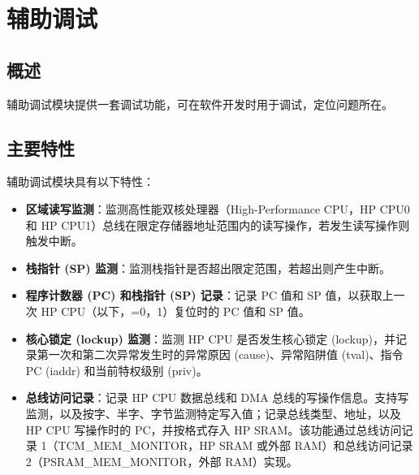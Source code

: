 \documentclass[main\_\_CN.tex]{subfiles}
\begin{document}
\setchineseformatting


\ifglobal
\else
    \clearpage
    \listoftodos
    \listofdonetodos
    \tableofcontents
\fi



\hypertarget{dbgassist}{}
\chapter{辅助调试}
\label{mod:dbgassist}

\section{概述}

\chipname{} 辅助调试模块提供一套调试功能，可在软件开发时用于调试，定位问题所在。

\section{主要特性}
\label{sec:dbgassist-features}

辅助调试模块具有以下特性：

\begin{itemize}
    \item \textbf{区域读写监测}：监测高性能双核处理器（High-Performance CPU，HP CPU0 和 HP CPU1）总线在限定存储器地址范围内的读写操作，若发生读写操作则触发中断。
    \item \textbf{栈指针 (SP) 监测}：监测栈指针是否超出限定范围，若超出则产生中断。
    \item \textbf{程序计数器 (PC) 和栈指针 (SP) 记录}：记录 PC 值和 SP 值，以获取上一次 HP CPU（以下，=0，1）复位时的 PC 值和 SP 值。
    \item \textbf{核心锁定 (lockup) 监测}：监测 HP CPU 是否发生核心锁定 (lockup)，并记录第一次和第二次异常发生时的异常原因 (cause)、异常陷阱值 (tval)、指令 PC (iaddr) 和当前特权级别 (priv)。
    \item \textbf{总线访问记录}：记录 HP CPU 数据总线和 DMA 总线的写操作信息。支持写监测，以及按字、半字、字节监测特定写入值；记录总线类型、地址，以及 HP CPU 写操作时的 PC，并按格式存入 HP SRAM。该功能通过总线访问记录 1（TCM\_MEM\_MONITOR，HP SRAM 或外部 RAM）和总线访问记录 2（PSRAM\_MEM\_MONITOR，外部 RAM）实现。
\end{itemize}
\end{document}
